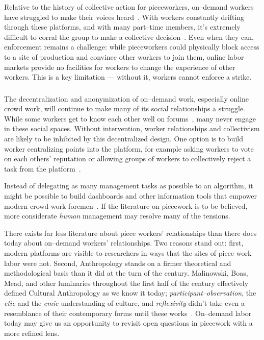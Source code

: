 \documentclass[pn4226]{subfiles}
\begin{document}
Relative to the history of collective action for pieceworkers,
on--demand workers have struggled to make their voices heard~\cite{dynamo,storiesIraniSilberman,turkopticon}.
With workers constantly drifting through these platforms, and with many part--time members,
it's extremely difficult to corral the group to make a collective decision~\cite{dynamo}.
Even when they can, enforcement remains a challenge:
while pieceworkers could physically block access to a site of production and convince other workers to join them,
online labor markets provide no facilities for workers to change the experience of other workers.
This is a key limitation --- without it, workers cannot enforce a strike.


\subsubsection{\implication}
The decentralization and anonymization of on--demand work, especially online crowd work, will continue to make many of its social relationships a struggle.
While some workers get to know each other well on forums~\cite{martin2014being,crowdcollab}, many never engage in these social spaces.
Without intervention, worker relationships and collectivism are likely to be inhibited by this decentralized design.
One option is to build worker centralizing points into the platform, for example asking workers to vote on each others' reputation or allowing groups of workers to collectively reject a task from the platform~\cite{crowdguilds}.

Instead of delegating as many management tasks as possible to an algorithm,
it might be possible to build dashboards and
other information tools that empower modern crowd work foremen~\cite{kulkarni2012mobileworks}.
If the literature on piecework is to be believed,
more considerate \textit{human} management may resolve
many of the tensions.

There exists far less literature about piece workers' relationships than there does today about on--demand workers' relationships.
Two reasons stand out: first, modern platforms are visible to researchers in ways that the sites of piece work labor were not.
Second, Anthropology stands on a firmer theoretical and methodological basis than it did at the turn of the  century.
Malinowski, Boas, Mead, and
other luminaries throughout the first half of the  century
effectively defined Cultural Anthropology as we know it today;
\textit{participant--observation},
the \textit{etic} and the \textit{emic} understanding of culture, and
\textit{reflexivity}
didn't take even a resemblance of their contemporary forms until these works~\cite{malinowski2002argonauts,boas1940race,mead1973coming}.
On--demand labor today may give us an opportunity to revisit open questions in piecework with a more refined lens.





\end{document}

